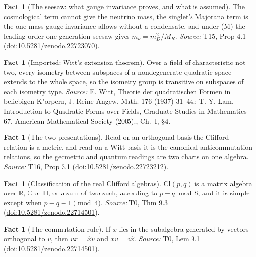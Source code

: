 \documentclass[11pt]{article}
\theoremstyle{definition}
\newtheorem{fact}[theorem]{Fact}
\theoremstyle{plain}
\providecommand{\C}{}\renewcommand{\C}{\mathbb{C}}
\providecommand{\Cl}{}\renewcommand{\Cl}{\mathrm{Cl}}
\providecommand{\HH}{}\renewcommand{\HH}{\mathbb{H}}
\providecommand{\R}{}\renewcommand{\R}{\mathbb{R}}
\begin{document}
\begin{fact}[The seesaw: what gauge invariance proves, and what is assumed]\label{c:neutrino.seesaw-what-gauge-invariance-proves-what}
The cosmological term cannot give the neutrino mass, the singlet's Majorana term is the one mass gauge invariance allows without a condensate, and under (M) the leading-order one-generation seesaw gives $m_{\nu} = m_{D}^{2}/M_{R}$.
\emph{Source:} T15, Prop 4.1 (\href{https://doi.org/10.5281/zenodo.22723070}{doi:10.5281/zenodo.22723070}).
\end{fact}

\begin{fact}[Imported: Witt's extension theorem]\label{c:one-relation.imported-witts-extension-theorem}
Over a field of characteristic not two, every isometry between subspaces of a nondegenerate quadratic space extends to the whole space, so the isometry group is transitive on subspaces of each isometry type.
\emph{Source:} E. Witt, Theorie der quadratischen Formen in beliebigen K"orpern, J. Reine Angew. Math. 176 (1937) 31--44.; T. Y. Lam, Introduction to Quadratic Forms over Fields, Graduate Studies in Mathematics 67, American Mathematical Society (2005)., Ch.~I, \S4.
\end{fact}

\begin{fact}[The two presentations]\label{c:one-relation.two-presentations}
Read on an orthogonal basis the Clifford relation is a metric, and read on a Witt basis it is the canonical anticommutation relations, so the geometric and quantum readings are two charts on one algebra.
\emph{Source:} T16, Prop 3.1 (\href{https://doi.org/10.5281/zenodo.22723212}{doi:10.5281/zenodo.22723212}).
\end{fact}

\begin{fact}[Classification of the real Clifford algebras]\label{c:primer.classification-real-clifford-algebras}
$\Cl(p,q)$ is a matrix algebra over $\R$, $\C$ or $\HH$, or a sum of two such, according to $p - q \bmod 8$, and it is simple except when $p - q \equiv 1 \pmod 4$.
\emph{Source:} T0, Thm 9.3 (\href{https://doi.org/10.5281/zenodo.22714501}{doi:10.5281/zenodo.22714501}).
\end{fact}

\begin{fact}[The commutation rule]\label{c:primer.commutation-rule}
If $x$ lies in the subalgebra generated by vectors orthogonal to $v$, then $v x = \hat{x} v$ and $x v = v \hat{x}$.
\emph{Source:} T0, Lem 9.1 (\href{https://doi.org/10.5281/zenodo.22714501}{doi:10.5281/zenodo.22714501}).
\end{fact}
\end{document}
